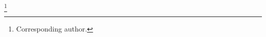 \documentclass[aps,prc,onecolumn,floatfix,showpacs,preprintnumbers,amsmath,amssymb,superscriptaddress]{revtex4-1}
\begin{document}
\author {Michael~C.~Kunkel}
\author {Moskov~J.~Amaryan}
\thanks{Corresponding author.}
\affiliation{\ODU}
\author {Igor~I.~Strakovsky}
\affiliation{\GWU}
\author {James~Ritman}
\affiliation{\BOCHUM}

\end{document}
